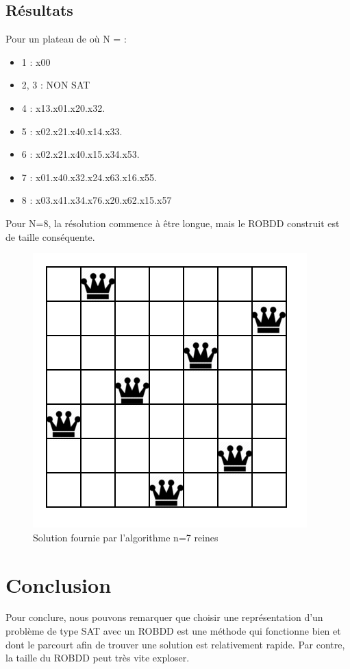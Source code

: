 \documentclass{article}
\begin{document}
\subsection{Résultats}
Pour un plateau de où N = :
\begin{itemize}
  \item 1 : x00
  \item 2, 3 : NON SAT
  \item 4 : x13.x01.x20.x32.
  \item 5 : x02.x21.x40.x14.x33.
  \item 6 : x02.x21.x40.x15.x34.x53.
  \item 7 : x01.x40.x32.x24.x63.x16.x55.
  \item 8 : x03.x41.x34.x76.x20.x62.x15.x57
\end{itemize}
Pour N=8, la résolution commence à être longue, mais le ROBDD construit est de taille conséquente.
\begin{figure}
	\begin{center}
		\includegraphics[scale=0.7]{sevenkingdom}\\
		Solution fournie par l'algorithme n=7 reines
	\end{center}
\end{figure}
\section{Conclusion}
Pour conclure, nous pouvons remarquer que choisir une représentation d'un problème de type SAT avec un ROBDD est une méthode qui fonctionne bien et dont le parcourt afin de trouver une solution est relativement rapide. Par contre, la taille du ROBDD peut très vite exploser.
\end{document}
